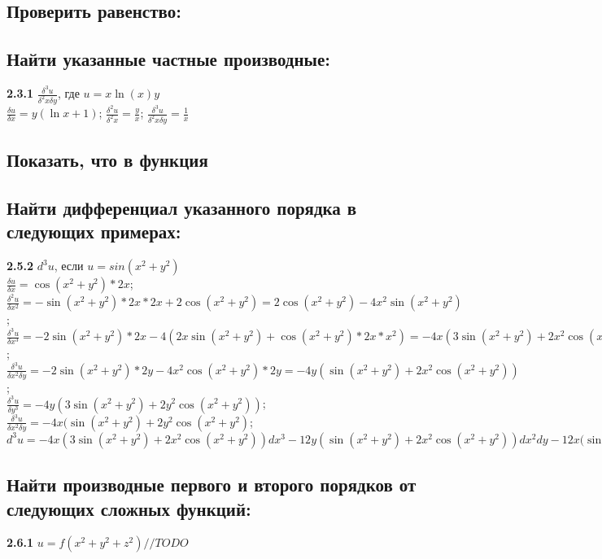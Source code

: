 \documentclass[a4paper]{article}
\begin{document}
    \subsection{Проверить равенство:}
    \subsection{Найти указанные частные производные:}
    \textbf{2.3.1}
    $\frac{\delta^3 u}{\delta^2 x \delta y}$, где $u = x\ln{(x)}y$ \\
    $\frac{\delta u}{\delta x} = y(\ln{x}+1)$;
    $\frac{\delta^2 u}{\delta^2 x} = \frac{y}{x}$;
    $\frac{\delta^3 u}{\delta^2 x \delta y} = \frac{1}{x}$
    \\ [15pt]
    \subsection{Показать, что в функция}
    \subsection{Найти дифференциал указанного порядка в следующих примерах:}
    \textbf{2.5.2}
    $d^3u$, если $u = sin(x^2+y^2)$ \\
    $\frac{\delta u}{\delta x} = \cos{(x^2+y^2)*2x}$;
    $\frac{\delta^2 u}{\delta x^2} = -\sin{(x^2+y^2)}*2x*2x+2\cos{(x^2+y^2)} = 
    2\cos{(x^2+y^2)} - 4x^2\sin{(x^2+y^2)}$; \\
    $\frac{\delta^3 u}{\delta x^3} = -2\sin{(x^2+y^2)}*2x-4(2x\sin{(x^2+y^2)}+\cos{(x^2+y^2)}*2x*x^2) =
    -4x(3\sin{(x^2+y^2)}+2x^2\cos{(x^2+y^2)})$; \\
    $\frac{\delta^3 u}{\delta x^2 \delta y} = 
    -2\sin{(x^2+y^2)}*2y - 4x^2\cos{(x^2+y^2)}*2y = 
    -4y(\sin{(x^2+y^2)}+2x^2\cos{(x^2+y^2)})$; \\
    $\frac{\delta^3 u}{\delta y^3} = 
    -4y(3\sin{(x^2+y^2)}+2y^2\cos{(x^2+y^2)})$;
    $\frac{\delta^3 u}{\delta x^2 \delta y} = -4x(\sin{(x^2+y^2)}+2y^2\cos{(x^2+y^2)}$; \\ [10pt]
    $d^3u = 
    -4x(3\sin{(x^2+y^2)}+2x^2\cos{(x^2+y^2)})dx^3 
    -12y(\sin{(x^2+y^2)}+2x^2\cos{(x^2+y^2)})dx^2dy
    -12x(\sin{(x^2+y^2)}+2y^2\cos{(x^2+y^2)}dxdy^2
    -4y(\sin{(x^2+y^2)}+2x^2\cos{(x^2+y^2)})dy^3$
    \\ [15pt]
    \subsection{Найти производные первого и второго порядков от следующих сложных функций:}
    \textbf{2.6.1}
    $u = f(x^2+y^2+z^2) //TODO$
    \\ [15pt]
\end{document}
